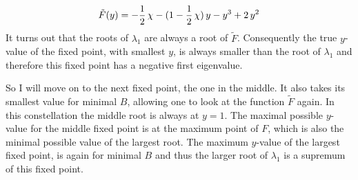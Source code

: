 \begin{align*}
    \tilde{F}({y})=-\frac{1}{2}\,\chi-(1-\frac{1}{2}\,\chi)\,{y}    - {y}^3+2\,{y}^2
\end{align*}
It turns out that the roots of $\lambda_1$ are always a root of $\tilde{F}$. Consequently the true $y$-value of the fixed point, with smallest $y$, is always smaller than the root of $\lambda_1$ and therefore this fixed point has a negative first eigenvalue.

So I will move on to the next fixed point, the one in the middle. It also takes its smallest value for minimal $B$, allowing one to look at the function $\tilde{F}$ again. In this constellation the middle root is always at ${y}=1$. The maximal possible $y$-value for the middle fixed point is at the maximum point of $F$, which is also the minimal possible value of the largest root. The maximum $y$-value of the largest fixed point, is again for minimal $B$ and thus the larger root of $\lambda_1$ is a supremum of this fixed point.

